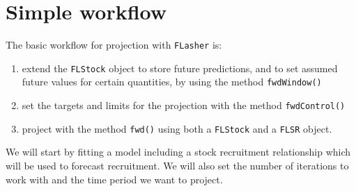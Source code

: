 \documentclass[
]{book}
\providecommand{\tightlist}{%
  \setlength{\itemsep}{0pt}\setlength{\parskip}{0pt}}
\begin{document}
\hypertarget{simple-workflow}{%
\section{Simple workflow}\label{simple-workflow}}

The basic workflow for projection with \texttt{FLasher} is:

\begin{enumerate}
\def\labelenumi{\arabic{enumi}.}
\tightlist
\item
  extend the \texttt{FLStock} object to store future predictions, and to set assumed future values for certain quantities, by using the method \texttt{fwdWindow()}
\item
  set the targets and limits for the projection with the method \texttt{fwdControl()}
\item
  project with the method \texttt{fwd()} using both a \texttt{FLStock} and a \texttt{FLSR} object.
\end{enumerate}

We will start by fitting a model including a stock recruitment relationship which will be used to forecast recruitment. We will also set the number of iterations to work with and the time period we want to project.
\end{document}
